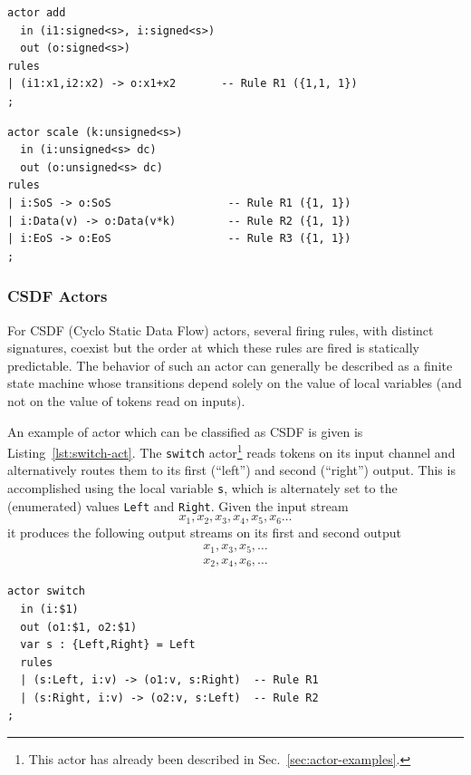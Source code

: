 \begin{lstlisting}[caption={A simple SDF actor in CAPH},label=lst:add-act]
actor add 
  in (i1:signed<s>, i:signed<s>)
  out (o:signed<s>)
rules
| (i1:x1,i2:x2) -> o:x1+x2       -- Rule R1 ({1,1, 1})
;
\end{lstlisting}

\begin{lstlisting}[caption={Another SDF actor},label=lst:scale-act]
actor scale (k:unsigned<s>)
  in (i:unsigned<s> dc)
  out (o:unsigned<s> dc)
rules
| i:SoS -> o:SoS                  -- Rule R1 ({1, 1})
| i:Data(v) -> o:Data(v*k)        -- Rule R2 ({1, 1})
| i:EoS -> o:EoS                  -- Rule R3 ({1, 1})
;
\end{lstlisting}

\subsubsection{CSDF Actors}
\label{sec:csdf-actors}

For CSDF (Cyclo Static Data Flow) actors, several firing rules, with distinct signatures, coexist
but the order at which these rules are fired is statically predictable. The behavior of
such an actor can generally be described as a finite state machine whose transitions depend solely on the
value of local variables (and not on the value of tokens read on inputs).

\medskip
An example of actor which can be classified as CSDF is given is Listing~\ref{lst:switch-act}.
The \verb|switch| actor\footnote{This actor has already been described in
  Sec.~\ref{sec:actor-examples}.} reads tokens on
its input channel and alternatively routes them to its first (``left'') and second (``right'')
output. This is accomplished using the local variable \texttt{s}, which is alternately set
  to the (enumerated) values \texttt{Left} and \texttt{Right}.
Given the input stream
\begin{equation*}
x_1, x_2, x_3, x_4, x_5, x_6 \ldots  
\end{equation*}
it produces the following output streams on its first and second output
\begin{eqnarray*}
x_1, x_3, x_5, \ldots  \\
x_2, x_4, x_6, \ldots  
\end{eqnarray*}

\begin{lstlisting}[caption={A simple CSDF actor in CAPH},label=lst:switch-act]
actor switch
  in (i:$1)
  out (o1:$1, o2:$1)
  var s : {Left,Right} = Left
  rules
  | (s:Left, i:v) -> (o1:v, s:Right)  -- Rule R1
  | (s:Right, i:v) -> (o2:v, s:Left)  -- Rule R2
;
\end{lstlisting}

